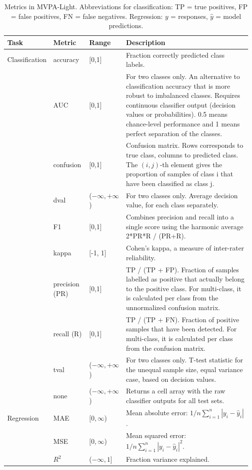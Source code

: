 \documentclass[utf8]{frontiersSCNS} %
\begin{document}
\begin{table}[]
\begin{tabularx}{\textwidth}{lllX}
Task & Metric &  Range & Description   \\\hline
Classification & accuracy  &  [0,1] &  Fraction correctly predicted class labels.\\
 & AUC & [0,1] & For two classes only. An alternative to classification accuracy that is more robust to imbalanced classes. Requires continuous classifier output (decision values or probabilities). 0.5 means chance-level performance and 1 means perfect separation of the classes.\\
 & confusion & [0,1] &  Confusion matrix. Rows corresponds to true class, columns  to predicted class. The $(i,j)$-th element gives the proportion of samples of class i that have been classified as class j.\\
 &dval & ($-\infty,+\infty$) & For two classes only. Average decision value, for each class separately.\\
 &F1 & [0,1] & Combines precision and recall into a single score using the harmonic average 2*PR*R / (PR+R).\\
&kappa & [-1, 1] & Cohen's kappa, a measure of inter-rater reliability.\\
&precision (PR) & [0,1] & TP / (TP + FP). Fraction of samples labelled as positive that actually belong to the positive class. For multi-class, it is calculated per class from the unnormalized confusion matrix.\\
&recall (R) & [0,1] & TP / (TP + FN). Fraction of positive samples that have been detected. For multi-class, it is calculated per class from the confusion matrix.\\
&tval & ($-\infty,+\infty$) & For two classes only. T-test statistic for the unequal sample size, equal variance case, based on decision values.\\
&none & ($-\infty,+\infty$) & Returns a cell array with the raw classifier outputs for all test sets.\\\hline
Regression & MAE  & [$0,\infty$) &  Mean absolute error: $1/n \sum_{i=1}^n|y_i - \hat{y}_i|$.\\
& MSE  & [$0,\infty$) &  Mean squared error: $1/n \sum_{i=1}^n|y_i - \hat{y}_i|^2$.\\
& $R^2$  & ($-\infty,1$] &  Fraction variance explained.\\
\hline
\end{tabularx}
\caption{Metrics in MVPA-Light. Abbreviations for classification: TP = true positives, FP = false positives, FN = false negatives. Regression: $y$ = responses, $\hat{y}$ = model predictions.}
\label{tab:metrics}
\end{table}
\end{document}
